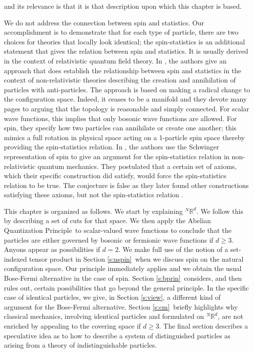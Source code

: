 \documentclass[11pt]{article}
\theoremstyle{remark}
\begin{document}
and its relevance is that it is that description upon which this
chapter is based. 


We do not address the connection
between spin and statistics. Our accomplishment is to demonstrate that
for each type of particle, there are two choices for theories that
locally look identical; the spin-statistics is an additional statement
that gives the relation between spin and statistics. It is usually
derived in the context of relativistic quantum field theory.
In \cite{Bal93}, the authors give
an approach that does establish the relationship between spin and
statistics in the context of non-relativistic theories describing the
creation and annihilation of particles with 
anti-particles. The approach is based
on making a radical change to the 
configuration space. Indeed, it ceases to be a manifold and they 
devote many pages to arguing that the topology is reasonable and
simply connected. 
For scalar wave functions, this implies that only bosonic wave functions are
allowed. For spin, they specify how two particles can annihilate or
create one another; this mimics a full rotation in physical space
acting on a 1-particle spin space thereby providing 
the spin-statistics relation.
In \cite{MR97}, the authors use the Schwinger representation of spin to
give an argument for the spin-statistics relation in non-relativistic
quantum mechanics. They postulated that a certain set of axioms, which 
their
specific construction did satisfy, would force the spin-statistics
relation to be true. The conjecture is false as  they 
later found other constructions satisfying these axioms, but 
 not the
spin-statistics relation \cite{MR01}. 


This chapter is organized as follows. We start by explaining \ensuremath{{}^N\ensuremath{\mathbb{R}^{d}}}. We
follow this by describing a set of cuts for that space. We then apply
the Abelian Quantization Principle\ to scalar-valued wave functions to  
conclude that
the particles are either governed by bosonic or fermionic wave functions if
$d \geq 3$. Anyons appear as possibilities if $d = 2$.  
We make full use of the notion of a set-indexed tensor product  
in Section {\ref{s:nspin}}\  when we discuss spin
on the natural 
configuration space. Our principle immediately applies and we obtain
the usual Bose-Fermi alternative in the case of spin. Section {\ref{s:bprin}}\
considers, and then rules out, certain possibilities that go beyond the
general principle. In the specific case of identical particles, we
give, in Section {\ref{s:view}}, a different 
 kind of argument for the Bose-Fermi
alternative. Section {\ref{s:cm}}\  briefly  highlights why classical mechanics,
involving identical particles and formulated on \ensuremath{{}^N\ensuremath{\mathbb{R}^{d}}},
are not enriched by appealing to the covering space if $d \geq 3$. 
The final section describes a speculative idea as to how to describe a
system of distinguished particles as arising from a theory of
indistinguishable particles.
\end{document}
